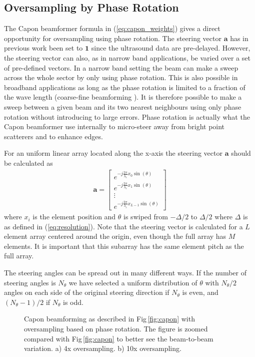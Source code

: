 \documentclass[journal]{IEEEtran}
\renewcommand{\vec}[1]{\mathbf{#1}}
\newcommand{\img}{img/}
\begin{document}
\subsection{Oversampling by Phase Rotation}
The Capon beamformer formula in (\ref{eq:capon_weights}) gives a direct opportunity for oversampling using phase rotation. The steering vector $\vec{a}$ has in previous work been set to $\vec{1}$ since the ultrasound data are pre-delayed. However, the steering vector can also, as in narrow band applications, be varied over a set of pre-defined vectors. In a narrow band setting the beam can make a sweep across the whole sector by only using phase rotation. This is also possible in broadband applications as long as the phase rotation is limited to a fraction of the wave length (coarse-fine beamforming \cite{Thomenius}). It is therefore possible to make a sweep between a given beam and its two nearest neighbours using only phase rotation without introducing to large errors. Phase rotation is actually what the Capon beamformer use internally to micro-steer away from bright point scatterers and to enhance edges. 

For an uniform linear array located along the x-axis the steering vector $\vec{a}$ should be calculated as 
\begin{align}
\vec{a} = 
\begin{bmatrix}
e^{-j\frac{2\pi}{\lambda_c}x_0\sin(\theta)} \\
e^{-j\frac{2\pi}{\lambda_c}x_1\sin(\theta)} \\
\vdots \\ 
e^{-j\frac{2\pi}{\lambda_c}x_{L-1}\sin(\theta)}
\end{bmatrix}
\end{align}
where $x_i$ is the element position and $\theta$ is swiped from $-\Delta/2$ to $\Delta/2$ where $\Delta$ is as defined in (\ref{eq:resolution}). Note that the steering vector is calculated for a $L$ element array centered around the origin, even though the full array has $M$ elements. It is important that this subarray has the same element pitch as the full array.

The steering angles can be spread out in many different ways. If the number of steering angles is $N_\theta$ we have selected a uniform distribution of $\theta$  with $N_\theta/2$ angles on each side of the original steering direction if $N_\theta$ is even, and $(N_\theta-1)/2$ if $N_\theta$ is odd. 

\begin{figure}[!t]
	\centerline{
	}
	\caption{Capon beamforming as described in Fig\,\ref{fig:capon} with oversampling based on phase rotation. The figure is zoomed compared with Fig\,\ref{fig:capon} to better see the beam-to-beam variation. a) 4x oversampling. b) 10x oversampling.}
	\label{fig:benchmark_capon_bs}
\end{figure}
\end{document}
